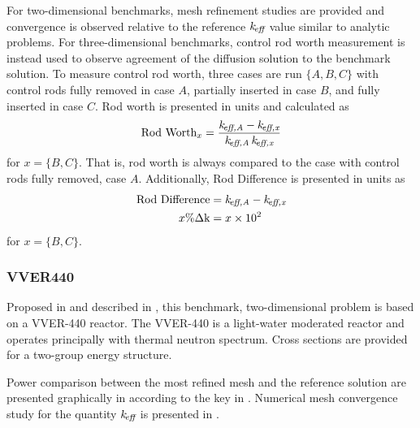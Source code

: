     For two-dimensional benchmarks, mesh refinement studies are provided and 
    convergence is observed relative to the reference $k_{\!\mbox{\scriptsize \em eff}}$ value similar to
    analytic problems. For three-dimensional benchmarks, control rod worth
    measurement is instead used to observe agreement of the diffusion solution 
    to the benchmark solution. To measure control rod worth, three cases are run
    $\{A,B,C\}$ with control rods fully removed in case $A$, partially inserted
    in case $B$, and fully inserted in case $C$. Rod worth is presented in 
    units  and calculated as 
    \begin{equation}
      \label{eq:rodworth}
      \text{Rod Worth}_x = \frac{k_{\!\mbox{\scriptsize \em eff,{A}}} - k_{\!\mbox{\scriptsize \em eff,{x}}}}
        {k_{\!\mbox{\scriptsize \em eff,{A}}} \, k_{\!\mbox{\scriptsize \em eff,{x}}}}
    \end{equation}
    for $x = \{B,C\}$. That is, rod worth is always compared to the case with
    control rods fully removed, case $A$. Additionally, Rod Difference is
    presented in units  as
    \begin{align}
      \label{eq:roddifference}
      \text{Rod Difference} &= k_{\!\mbox{\scriptsize \em eff,{A}}} - k_{\!\mbox{\scriptsize \em eff,{x}}} \\
      x \% \Delta \text{k}  &= x \times 10^2
    \end{align}
    for $x = \{B,C\}$.


    \subsubsection{VVER440}
      Proposed in \cite{chao} and described in , this
      benchmark, two-dimensional problem is based on a
      VVER-440 reactor. The VVER-440 is a 
      light-water moderated reactor and operates principally with thermal 
      neutron spectrum. Cross sections are provided for a two-group energy 
      structure.
      
      Power comparison between the most refined mesh and the reference solution 
      are presented graphically in  according to the
      key in . Numerical mesh convergence study for 
      the quantity $k_{\!\mbox{\scriptsize \em eff}}$ is presented in .

